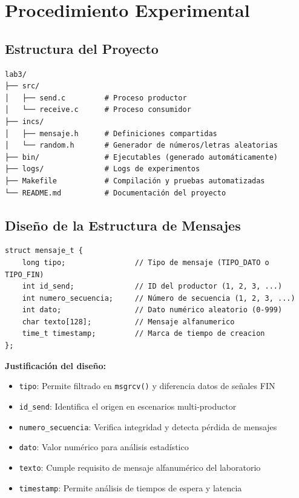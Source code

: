 \documentclass[10pt]{article}
\begin{document}
\section{Procedimiento Experimental}

\subsection{Estructura del Proyecto}
\begin{verbatim}
lab3/
├── src/
│   ├── send.c         # Proceso productor
│   └── receive.c      # Proceso consumidor
├── incs/
│   ├── mensaje.h      # Definiciones compartidas
│   └── random.h       # Generador de números/letras aleatorias
├── bin/               # Ejecutables (generado automáticamente)
├── logs/              # Logs de experimentos
├── Makefile           # Compilación y pruebas automatizadas
└── README.md          # Documentación del proyecto
\end{verbatim}

\subsection{Diseño de la Estructura de Mensajes}
\begin{lstlisting}[caption=Estructura completa del mensaje implementado]
struct mensaje_t {
    long tipo;                // Tipo de mensaje (TIPO_DATO o TIPO_FIN)
    int id_send;              // ID del productor (1, 2, 3, ...)
    int numero_secuencia;     // Número de secuencia (1, 2, 3, ...)
    int dato;                 // Dato numérico aleatorio (0-999)
    char texto[128];          // Mensaje alfanumerico
    time_t timestamp;         // Marca de tiempo de creacion
};
\end{lstlisting}

\textbf{Justificación del diseño:}
\begin{itemize}
  \item \texttt{tipo}: Permite filtrado en \texttt{msgrcv()} y diferencia datos de señales FIN
  \item \texttt{id\_send}: Identifica el origen en escenarios multi-productor
  \item \texttt{numero\_secuencia}: Verifica integridad y detecta pérdida de mensajes
  \item \texttt{dato}: Valor numérico para análisis estadístico
  \item \texttt{texto}: Cumple requisito de mensaje alfanumérico del laboratorio
  \item \texttt{timestamp}: Permite análisis de tiempos de espera y latencia
\end{itemize}
\end{document}
